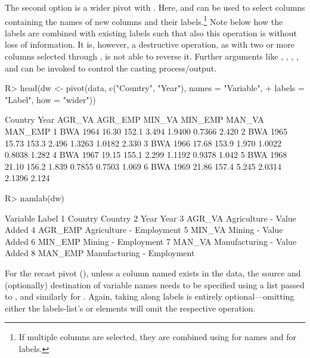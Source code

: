 \documentclass[nojss]{jss} %
\newcommand{\fct}[1]{\code{#1()}}
\begin{document}
The second option is a wider pivot with . Here,  and  can be used to select columns containing the names of new columns and their labels.\footnote{If multiple columns are selected, they are combined using  for names and  for labels. \vspace{-5mm}} Note below how the labels are combined with existing labels such that also this operation is without loss of information. It is, however, a destructive operation, as with two or more columns selected through , \fct{pivot} is not able to reverse it. Further arguments like , , , , and  can be invoked to control the casting process/output.
%
\begin{Schunk}
\begin{Sinput}
R> head(dw <- pivot(data, c("Country", "Year"), names = "Variable",
+    labels = "Label", how = "wider"))
\end{Sinput}
\begin{Soutput}
  Country Year AGR_VA AGR_EMP MIN_VA MIN_EMP MAN_VA MAN_EMP
1     BWA 1964  16.30   152.1  3.494  1.9400 0.7366   2.420
2     BWA 1965  15.73   153.3  2.496  1.3263 1.0182   2.330
3     BWA 1966  17.68   153.9  1.970  1.0022 0.8038   1.282
4     BWA 1967  19.15   155.1  2.299  1.1192 0.9378   1.042
5     BWA 1968  21.10   156.2  1.839  0.7855 0.7503   1.069
6     BWA 1969  21.86   157.4  5.245  2.0314 2.1396   2.124
\end{Soutput}
\begin{Sinput}
R> namlab(dw)
\end{Sinput}
\begin{Soutput}
  Variable                       Label
1  Country                     Country
2     Year                        Year
3   AGR_VA   Agriculture - Value Added
4  AGR_EMP    Agriculture - Employment
5   MIN_VA        Mining - Value Added
6  MIN_EMP         Mining - Employment
7   MAN_VA Manufacturing - Value Added
8  MAN_EMP  Manufacturing - Employment
\end{Soutput}
\end{Schunk}
%
For the recast pivot (), unless a column named  exists in the data, the source and (optionally) destination of variable names needs to be specified using a list passed to , and similarly for . Again, taking along labels is entirely optional---omitting either the labels-list's  or  elements will omit the respective operation.
\end{document}
